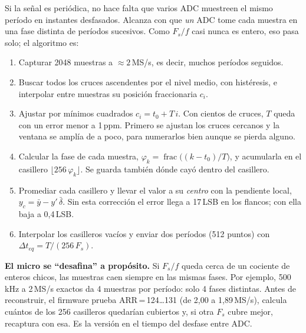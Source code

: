 \documentclass[11pt,a4paper]{article}
\begin{document}
Si la señal es periódica, no hace falta que varios ADC muestreen el mismo
período en instantes desfasados. Alcanza con que \emph{un} ADC tome cada muestra
en una fase distinta de períodos sucesivos. Como $F_s/f$ casi nunca es entero,
eso pasa solo; el algoritmo es:

\begin{enumerate}\itemsep1pt
  \item Capturar 2048 muestras a $\approx 2$\,MS/s, es decir, muchos períodos seguidos.
  \item Buscar todos los cruces ascendentes por el nivel medio, con histéresis,
        e interpolar entre muestras su posición fraccionaria $c_i$.
  \item Ajustar por mínimos cuadrados $c_i = t_0 + T\,i$. Con cientos de cruces,
        $T$ queda con un error menor a 1\,ppm. Primero se ajustan los cruces
        cercanos y la ventana se amplía de a poco, para numerarlos bien aunque
        se pierda alguno.
  \item Calcular la fase de cada muestra, $\varphi_k = \operatorname{frac}\big((k-t_0)/T\big)$,
        y acumularla en el casillero $\lfloor 256\,\varphi_k \rfloor$. Se guarda
        también dónde cayó dentro del casillero.
  \item Promediar cada casillero y llevar el valor a su \emph{centro} con la
        pendiente local, $y_c = \bar y - y'\,\bar\delta$. Sin esta corrección el
        error llega a 17\,LSB en los flancos; con ella baja a 0,4\,LSB.
  \item Interpolar los casilleros vacíos y enviar dos períodos (512 puntos) con
        $\Delta t_{eq} = T/(256\,F_s)$.
\end{enumerate}

\noindent\textbf{El micro se ``desafina'' a propósito.} Si $F_s/f$ queda cerca
de un cociente de enteros chicos, las muestras caen siempre en las mismas fases.
Por ejemplo, 500\,kHz a 2\,MS/s exactos da 4 muestras por período: solo 4 fases
distintas. Antes de reconstruir, el firmware prueba ARR\,=\,124\ldots131 (de 2,00
a 1,89\,MS/s), calcula cuántos de los 256 casilleros quedarían cubiertos y, si
otra $F_s$ cubre mejor, recaptura con esa. Es la versión en el tiempo del
desfase entre ADC.
\end{document}
